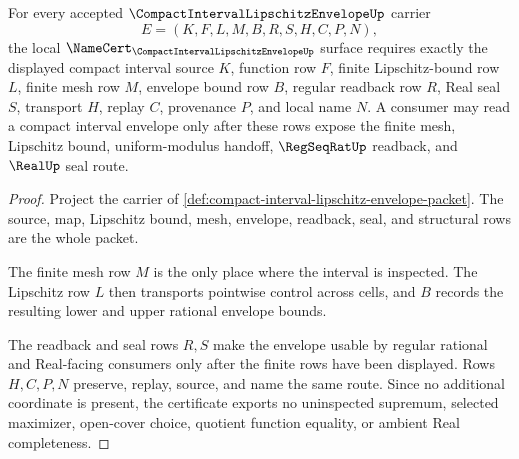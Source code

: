 \begin{theorem}
\label{thm:compact-interval-lipschitz-envelope-namecert-obligations}
For every accepted $\CompactIntervalLipschitzEnvelopeUp$ carrier
$$
E=(K,F,L,M,B,R,S,H,C,P,N),
$$
the local $\NameCert_{\CompactIntervalLipschitzEnvelopeUp}$ surface requires exactly the displayed compact interval source $K$, function row $F$, finite Lipschitz-bound row $L$, finite mesh row $M$, envelope bound row $B$, regular readback row $R$, Real seal $S$, transport $H$, replay $C$, provenance $P$, and local name $N$. A consumer may read a compact interval envelope only after these rows expose the finite mesh, Lipschitz bound, uniform-modulus handoff, $\RegSeqRatUp$ readback, and $\RealUp$ seal route.
\end{theorem}
\begin{proof}
Project the carrier of \autoref{def:compact-interval-lipschitz-envelope-packet}. The source, map, Lipschitz bound, mesh, envelope, readback, seal, and structural rows are the whole packet.

The finite mesh row $M$ is the only place where the interval is inspected. The Lipschitz row $L$ then transports pointwise control across cells, and $B$ records the resulting lower and upper rational envelope bounds.

The readback and seal rows $R,S$ make the envelope usable by regular rational and Real-facing consumers only after the finite rows have been displayed. Rows $H,C,P,N$ preserve, replay, source, and name the same route. Since no additional coordinate is present, the certificate exports no uninspected supremum, selected maximizer, open-cover choice, quotient function equality, or ambient Real completeness.
\end{proof}

